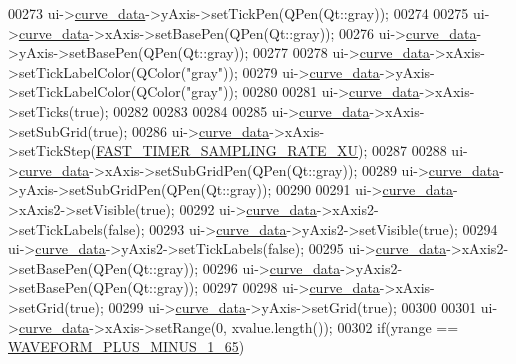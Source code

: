 \begin{DoxyCode}
00273     ui->\hyperlink{a00028_a247d94481323c0bc4f8b6458a8a535dd}{curve\_data}->yAxis->setTickPen(QPen(Qt::gray));
00274 
00275     ui->\hyperlink{a00028_a247d94481323c0bc4f8b6458a8a535dd}{curve\_data}->xAxis->setBasePen(QPen(Qt::gray));
00276     ui->\hyperlink{a00028_a247d94481323c0bc4f8b6458a8a535dd}{curve\_data}->yAxis->setBasePen(QPen(Qt::gray));
00277 
00278     ui->\hyperlink{a00028_a247d94481323c0bc4f8b6458a8a535dd}{curve\_data}->xAxis->setTickLabelColor(QColor(\textcolor{stringliteral}{"gray"}));
00279     ui->\hyperlink{a00028_a247d94481323c0bc4f8b6458a8a535dd}{curve\_data}->yAxis->setTickLabelColor(QColor(\textcolor{stringliteral}{"gray"}));
00280 
00281     ui->\hyperlink{a00028_a247d94481323c0bc4f8b6458a8a535dd}{curve\_data}->xAxis->setTicks(\textcolor{keyword}{true});
00282 
00283 
00284 
00285     ui->\hyperlink{a00028_a247d94481323c0bc4f8b6458a8a535dd}{curve\_data}->xAxis->setSubGrid(\textcolor{keyword}{true});
00286     ui->\hyperlink{a00028_a247d94481323c0bc4f8b6458a8a535dd}{curve\_data}->xAxis->setTickStep(\hyperlink{a00031_a87ea9a0eaa474d8b8f672cfa5cbb091f}{FAST\_TIMER\_SAMPLING\_RATE\_XU});
00287 
00288     ui->\hyperlink{a00028_a247d94481323c0bc4f8b6458a8a535dd}{curve\_data}->xAxis->setSubGridPen(QPen(Qt::gray));
00289     ui->\hyperlink{a00028_a247d94481323c0bc4f8b6458a8a535dd}{curve\_data}->yAxis->setSubGridPen(QPen(Qt::gray));
00290 
00291     ui->\hyperlink{a00028_a247d94481323c0bc4f8b6458a8a535dd}{curve\_data}->xAxis2->setVisible(\textcolor{keyword}{true});
00292     ui->\hyperlink{a00028_a247d94481323c0bc4f8b6458a8a535dd}{curve\_data}->xAxis2->setTickLabels(\textcolor{keyword}{false});
00293     ui->\hyperlink{a00028_a247d94481323c0bc4f8b6458a8a535dd}{curve\_data}->yAxis2->setVisible(\textcolor{keyword}{true});
00294     ui->\hyperlink{a00028_a247d94481323c0bc4f8b6458a8a535dd}{curve\_data}->yAxis2->setTickLabels(\textcolor{keyword}{false});
00295     ui->\hyperlink{a00028_a247d94481323c0bc4f8b6458a8a535dd}{curve\_data}->xAxis2->setBasePen(QPen(Qt::gray));
00296     ui->\hyperlink{a00028_a247d94481323c0bc4f8b6458a8a535dd}{curve\_data}->yAxis2->setBasePen(QPen(Qt::gray));
00297 
00298      ui->\hyperlink{a00028_a247d94481323c0bc4f8b6458a8a535dd}{curve\_data}->xAxis->setGrid(\textcolor{keyword}{true});
00299      ui->\hyperlink{a00028_a247d94481323c0bc4f8b6458a8a535dd}{curve\_data}->yAxis->setGrid(\textcolor{keyword}{true});
00300 
00301   ui->\hyperlink{a00028_a247d94481323c0bc4f8b6458a8a535dd}{curve\_data}->xAxis->setRange(0, xvalue.length());
00302   \textcolor{keywordflow}{if}(yrange == \hyperlink{a00034_a0923d3b365a36e1e8c401cec964aa36f}{WAVEFORM\_PLUS\_MINUS\_1\_65})

\end{DoxyCode}
